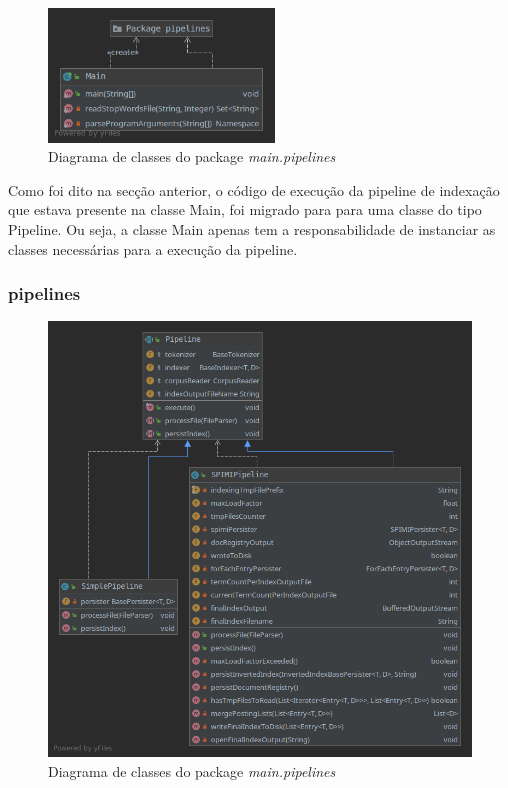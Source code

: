 \documentclass[12pt]{article}
\begin{document}
\begin{figure}[h]
  \center
  \includegraphics[width=6cm]{packages_main.png}
  \caption{Diagrama de classes do package \it main.pipelines}
\end{figure}


Como foi dito na secção anterior, o código de execução da pipeline
de indexação que estava presente na classe Main, foi migrado para
para uma classe do tipo Pipeline. Ou seja, a classe Main apenas
tem a responsabilidade de instanciar as classes necessárias para
a execução da pipeline.

\subsubsection{pipelines}

\begin{figure}[h]
  \center
  \includegraphics[width=\linewidth]{packages_main_pipelines.png}
  \caption{Diagrama de classes do package \it main.pipelines}
\end{figure}
\end{document}
